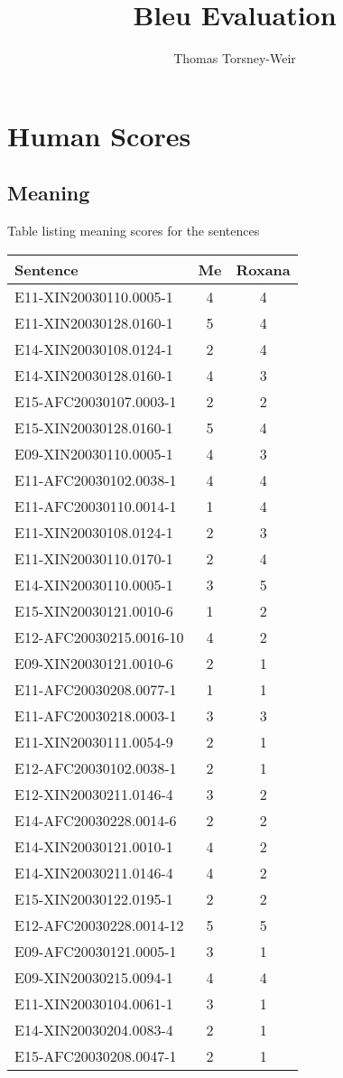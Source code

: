 \documentclass{article}
\author{Thomas Torsney-Weir}
\title{Bleu Evaluation}
\begin{document}
\maketitle

\section{Human Scores}

\subsection{Meaning}
Table listing meaning scores for the sentences

\begin{tabular}{|l|c|c|}
\hline
Sentence               & Me & Roxana \\
\hline \hline
E11-XIN20030110.0005-1 & 4 & 4 \\ \hline
E11-XIN20030128.0160-1 & 5 & 4 \\ \hline
E14-XIN20030108.0124-1 & 2 & 4 \\ \hline
E14-XIN20030128.0160-1 & 4 & 3 \\ \hline
E15-AFC20030107.0003-1 & 2 & 2 \\ \hline
E15-XIN20030128.0160-1 & 5 & 4 \\ \hline
E09-XIN20030110.0005-1 & 4 & 3 \\ \hline
E11-AFC20030102.0038-1 & 4 & 4 \\ \hline
E11-AFC20030110.0014-1 & 1 & 4 \\ \hline
E11-XIN20030108.0124-1 & 2 & 3 \\ \hline
E11-XIN20030110.0170-1 & 2 & 4 \\ \hline
E14-XIN20030110.0005-1 & 3 & 5 \\ \hline
E15-XIN20030121.0010-6 & 1 & 2 \\ \hline
E12-AFC20030215.0016-10 & 4 & 2 \\ \hline
E09-XIN20030121.0010-6 & 2 & 1 \\ \hline
E11-AFC20030208.0077-1 & 1 & 1 \\ \hline
E11-AFC20030218.0003-1 & 3 & 3 \\ \hline
E11-XIN20030111.0054-9 & 2 & 1 \\ \hline
E12-AFC20030102.0038-1 & 2 & 1 \\ \hline
E12-XIN20030211.0146-4 & 3 & 2 \\ \hline
E14-AFC20030228.0014-6 & 2 & 2 \\ \hline
E14-XIN20030121.0010-1 & 4 & 2 \\ \hline
E14-XIN20030211.0146-4 & 4 & 2 \\ \hline
E15-XIN20030122.0195-1 & 2 & 2 \\ \hline
E12-AFC20030228.0014-12 & 5 & 5 \\ \hline
E09-AFC20030121.0005-1 & 3 & 1 \\ \hline
E09-XIN20030215.0094-1 & 4 & 4 \\ \hline
E11-XIN20030104.0061-1 & 3 & 1 \\ \hline
E14-XIN20030204.0083-4 & 2 & 1 \\ \hline
E15-AFC20030208.0047-1 & 2 & 1 \\ 
\hline
\end{tabular}
\end{document}
